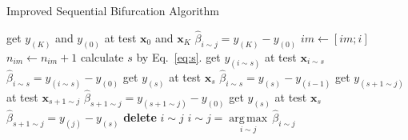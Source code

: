 \documentclass{article}
\begin{document}
\begin{algorithm}[h]
	\caption{Improved Sequential Bifurcation Algorithm}
    \label{alg:ISB}
	\begin{algorithmic}[1]
		\State get $y_{(K)}$ and $y_{(0)}$ at test $\boldsymbol{x}_{0}$ and $\boldsymbol{x}_{K}$
		\State $\hat{\beta}_{i \sim j} = y_{(K)}-y_{(0)}$
		\label{code:stop}
		\State $im\gets [im; i]$
		\State $ n_{im}\gets n_{im} + 1 $
		\Else
		\State calculate $s$ by Eq.~\eqref{eq:s}.
		\label{code:s}
		\State get $y_{(i\sim s)}$ at test $\boldsymbol{x}_{i\sim s}$
		\State $\hat{\beta}_{i \sim s} = y_{(i\sim s)}-y_{(0)}$
		\Else 
		\State get $y_{(s)}$ at test $\boldsymbol{x}_{s}$
		\State $\hat{\beta}_{i \sim s} = y_{(s)}-y_{(i-1)}$
		\EndIf
		\State get $y_{(s+1\sim j)}$ at test $\boldsymbol{x}_{s+1\sim j}$
		\State $\hat{\beta}_{s+1\sim j} = y_{(s+1\sim j)}-y_{(0)}$
		\Else 
		\State get $y_{(s)}$ at test $\boldsymbol{x}_{s}$
		\State $\hat{\beta}_{s+1 \sim j} = y_{(j)}-y_{(s)}$
		\EndIf
		\EndIf
		\State \textbf{delete} $i \sim j$
		\State $i\sim j = \underset{i\sim j}{\operatorname{arg\,max}}\, \hat{\beta}_{i\sim j}$ 
		\EndWhile
	\end{algorithmic}
\end{algorithm}
\end{document}
